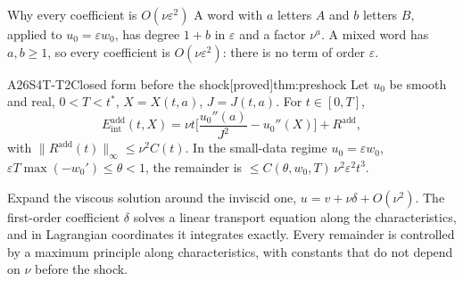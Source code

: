 \documentclass[11pt,a4paper,oneside]{report}
\newcommand{\badge}[2]{\textcolor{#1}{\textsf{\footnotesize[#2]}}}
\newcommand{\proved}{\badge{cC}{proved}}
\newcommand{\Eint}{E_{\mathrm{int}}}
\newenvironment{dimcard}[5]{\par\Needspace{12\baselineskip}\begin{dimcardbox}{#1}{#2}{#3}{#4}{#5}}{\end{dimcardbox}}
\begin{document}
\begin{aside}{Why every coefficient is $O(\nu\varepsilon^2)$}
A word with $a$ letters $A$ and $b$ letters $B$, applied to $u_0=\varepsilon w_0$, has degree $1+b$ in $\varepsilon$ and a factor $\nu^a$. A mixed word has $a,b\ge1$, so every coefficient is $O(\nu\varepsilon^2)$: there is no term of order $\varepsilon$.
\end{aside}

\begin{dimcard}{A26}{S4T-T2}{Closed form before the shock}{\proved}{thm:preshock}
Let $u_0$ be smooth and real, $0<T<t^*$, $X=X(t,a)$, $J=J(t,a)$. For $t\in[0,T]$,
\[
\Eint^{\mathrm{add}}(t,X)=\nu t\Big[\frac{u_0''(a)}{J^2}-u_0''(X)\Big]+R^{\mathrm{add}},
\]
with $\|R^{\mathrm{add}}(t)\|_\infty\le\nu^2C(t)$. In the small-data regime $u_0=\varepsilon w_0$, $\varepsilon T\max(-w_0')\le\theta<1$, the remainder is $\le C(\theta,w_0,T)\,\nu^2\varepsilon^2t^3$.
\end{dimcard}

\begin{proofidea}
Expand the viscous solution around the inviscid one, $u=v+\nu\delta+O(\nu^2)$. The first-order coefficient $\delta$ solves a linear transport equation along the characteristics, and in Lagrangian coordinates it integrates exactly. Every remainder is controlled by a maximum principle along characteristics, with constants that do not depend on $\nu$ before the shock.
\end{proofidea}
\end{document}
